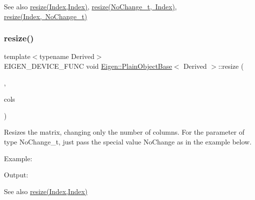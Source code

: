 \begin{DoxySeeAlso}{See also}
\mbox{\hyperlink{class_eigen_1_1_plain_object_base_a99d9054ee2d5a40c6e00ded0265e9cea}{resize(\+Index,\+Index)}}, \mbox{\hyperlink{class_eigen_1_1_plain_object_base_ab71a655f73d05a0e389e3ed13b6fe5f3}{resize(\+No\+Change\+\_\+t, Index)}}, \mbox{\hyperlink{class_eigen_1_1_plain_object_base_a7b44761b7350ae3756035bbf7d7c04f6}{resize(\+Index, No\+Change\+\_\+t)}} 
\end{DoxySeeAlso}
\mbox{\label{class_eigen_1_1_plain_object_base_ab71a655f73d05a0e389e3ed13b6fe5f3}} 
\subsubsection{\texorpdfstring{resize()}{resize()}\hspace{0.1cm}{\footnotesize\ttfamily [3/4]}}
{\footnotesize\ttfamily template$<$typename Derived$>$ \\
E\+I\+G\+E\+N\+\_\+\+D\+E\+V\+I\+C\+E\+\_\+\+F\+U\+NC void \mbox{\hyperlink{class_eigen_1_1_plain_object_base}{Eigen\+::\+Plain\+Object\+Base}}$<$ Derived $>$\+::resize (\begin{DoxyParamCaption}\item[{No\+Change\+\_\+t}]{,  }\item[{Index}]{cols }\end{DoxyParamCaption})\hspace{0.3cm}{\ttfamily [inline]}}

Resizes the matrix, changing only the number of columns. For the parameter of type No\+Change\+\_\+t, just pass the special value {\ttfamily No\+Change} as in the example below.

Example\+: 
\begin{DoxyCodeInclude}{0}
\end{DoxyCodeInclude}
 Output\+: 
\begin{DoxyVerbInclude}
\end{DoxyVerbInclude}


\begin{DoxySeeAlso}{See also}
\mbox{\hyperlink{class_eigen_1_1_plain_object_base_a99d9054ee2d5a40c6e00ded0265e9cea}{resize(\+Index,\+Index)}} 
\end{DoxySeeAlso}
\mbox{\label{class_eigen_1_1_plain_object_base_a7b44761b7350ae3756035bbf7d7c04f6}} 
